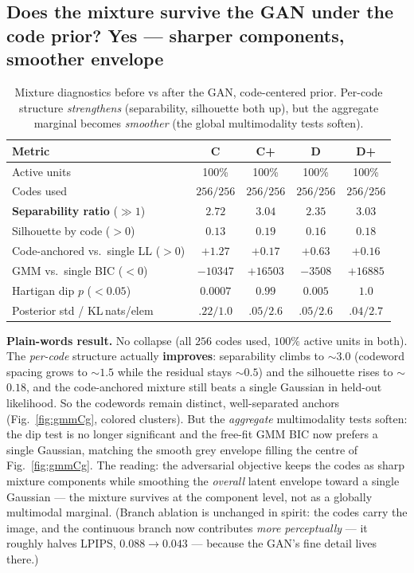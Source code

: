 \documentclass[11pt]{article}
\newcommand{\good}[1]{\textcolor{green!55!black}{#1}}
\newcommand{\bad}[1]{\textcolor{red!70!black}{#1}}
\begin{document}
\subsection*{Does the mixture survive the GAN under the code prior? Yes --- sharper components,
smoother envelope}
\begin{table}[h]
\centering
\caption{Mixture diagnostics before vs after the GAN, code-centered prior. Per-code structure
\emph{strengthens} (separability, silhouette both up), but the aggregate marginal becomes
\emph{smoother} (the global multimodality tests soften).}
\label{tab:gmmgan}
\small
\begin{tabular}{lcccc}
\toprule
Metric & \textbf{C} & \textbf{C+} & \textbf{D} & \textbf{D+}\\
\midrule
Active units                     & \good{100\%} & \good{100\%} & \good{100\%} & \good{100\%}\\
Codes used                       & $256/256$ & $256/256$ & $256/256$ & $256/256$\\
\textbf{Separability ratio} ($\gg1$) & $2.72$ & \good{$3.04$} & $2.35$ & \good{$3.03$}\\
Silhouette by code ($>0$)        & $0.13$ & \good{$0.19$} & $0.16$ & \good{$0.18$}\\
Code-anchored vs.\ single LL ($>0$) & \good{$+1.27$} & \good{$+0.17$} & \good{$+0.63$} & \good{$+0.16$}\\
GMM vs.\ single BIC ($<0$)       & \good{$-10347$} & \bad{$+16503$} & \good{$-3508$} & \bad{$+16885$}\\
Hartigan dip $p$ ($<0.05$)       & \good{$0.0007$} & \bad{$0.99$} & \good{$0.005$} & \bad{$1.0$}\\
Posterior std / KL\,nats/elem    & $.22 / 1.0$ & $.05 / 2.6$ & $.05 / 2.6$ & $.04 / 2.7$\\
\bottomrule
\end{tabular}
\end{table}

\textbf{Plain-words result.} No collapse (all $256$ codes used, $100\%$ active units in both).
The \emph{per-code} structure actually \textbf{improves}: separability climbs to $\sim$$3.0$
(codeword spacing grows to $\sim$$1.5$ while the residual stays $\sim$$0.5$) and the silhouette
rises to $\sim$$0.18$, and the code-anchored mixture still beats a single Gaussian in held-out
likelihood. So the codewords remain distinct, well-separated anchors (Fig.~\ref{fig:gmmCg},
colored clusters). But the \emph{aggregate} multimodality tests soften: the dip test is no longer
significant and the free-fit GMM BIC now prefers a single Gaussian, matching the smooth grey
envelope filling the centre of Fig.~\ref{fig:gmmCg}. The reading: the adversarial objective keeps
the codes as sharp mixture components while smoothing the \emph{overall} latent envelope toward a
single Gaussian --- the mixture survives at the component level, not as a globally multimodal
marginal. (Branch ablation is unchanged in spirit: the codes carry the image, and the continuous
branch now contributes \emph{more perceptually} --- it roughly halves LPIPS, $0.088\to0.043$ ---
because the GAN's fine detail lives there.)
\end{document}
